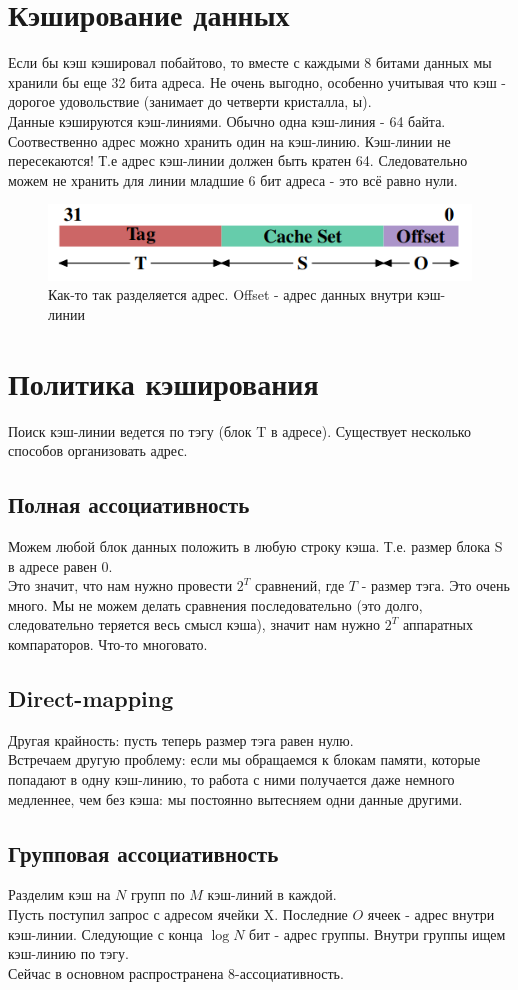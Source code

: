 \documentclass[12pt, a4paper]{article}
\begin{document}
\section{Кэширование данных}
Если бы кэш кэшировал побайтово, то вместе с каждыми 8 битами данных мы хранили бы еще 32 бита адреса. Не очень выгодно, особенно учитывая что кэш - дорогое удовольствие (занимает до четверти кристалла, ы).\\
Данные кэшируются кэш-линиями. Обычно одна кэш-линия - 64 байта. Соотвественно адрес можно хранить один на кэш-линию. Кэш-линии не пересекаются! Т.е адрес кэш-линии должен быть кратен 64. Следовательно можем не хранить для линии младшие 6 бит адреса - это всё равно нули.
\begin{figure}[h]
    \centering
    \includegraphics[width=0.6\linewidth]{./images/lineADDR.png}
    \caption{Как-то так разделяется адрес. Offset - адрес данных внутри кэш-линии}
    \label{fig:lineADDR}
\end{figure}
\section{Политика кэширования}
Поиск кэш-линии ведется по тэгу (блок T в адресе). Существует несколько способов организовать адрес.
\subsection{Полная ассоциативность}
Можем любой блок данных положить в любую строку кэша. Т.е. размер блока S в адресе равен 0.\\
Это значит, что нам нужно провести $2^T$ сравнений, где $T$ - размер тэга. Это очень много. Мы не можем делать сравнения последовательно (это долго, следовательно теряется весь смысл кэша), значит нам нужно $2^T$ аппаратных компараторов. Что-то многовато.
\subsection{Direct-mapping}
Другая крайность: пусть теперь размер тэга равен нулю.\\ Встречаем другую проблему: если мы обращаемся к блокам памяти, которые попадают в одну кэш-линию, то работа с ними получается даже немного медленнее, чем без кэша: мы постоянно вытесняем одни данные другими.
\subsection{Групповая ассоциативность}
Разделим кэш на $N$ групп по $M$ кэш-линий в каждой.\\
Пусть поступил запрос с адресом ячейки X. Последние $O$ ячеек - адрес внутри кэш-линии. Следующие с конца $\log N$ бит - адрес группы. Внутри группы ищем кэш-линию по тэгу.\\
Сейчас в основном распространена 8-ассоциативность.
\end{document}
